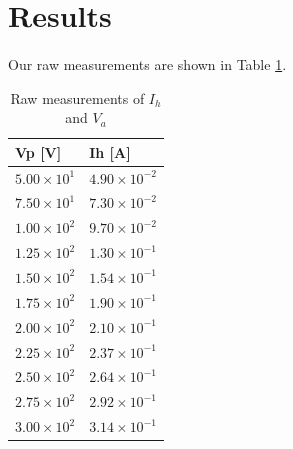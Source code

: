 \documentclass{article}
\begin{document}
\section{Results}
\paragraph{}
Our raw measurements are shown in Table \ref{tb:results}.

\begin{table}[H]
  \caption{Raw measurements of \(I_h\) and \(V_a\)}
  \label{tb:results}
  \begin{tabular}{|c|c|}
  \hline
  \multicolumn{1}{|l|}{\textbf{Vp {[}V{]}}} & \multicolumn{1}{l|}{\textbf{Ih {[}A{]}}} \\ \hline
  \(5.00 \times 10^1\)                                  & \(4.90 \times 10^{-2}\)                                 \\ \hline
  \(7.50 \times 10^1\)                                  & \(7.30 \times 10^{-2}\)                                 \\ \hline
  \(1.00 \times 10^2\)                                  & \(9.70 \times 10^{-2}\)                                 \\ \hline
  \(1.25 \times 10^2\)                                  & \(1.30 \times 10^{-1}\)                                 \\ \hline
  \(1.50 \times 10^2\)                                  & \(1.54 \times 10^{-1}\)                                 \\ \hline
  \(1.75 \times 10^2\)                                  & \(1.90 \times 10^{-1}\)                                 \\ \hline
  \(2.00 \times 10^2\)                                  & \(2.10 \times 10^{-1}\)                                 \\ \hline
  \(2.25 \times 10^2\)                                  & \(2.37 \times 10^{-1}\)                                 \\ \hline
  \(2.50 \times 10^2\)                                  & \(2.64 \times 10^{-1}\)                                 \\ \hline
  \(2.75 \times 10^2\)                                  & \(2.92 \times 10^{-1}\)                                 \\ \hline
  \(3.00 \times 10^2\)                                  & \(3.14 \times 10^{-1}\)                                 \\ \hline
  \end{tabular}
\end{table}
\end{document}
